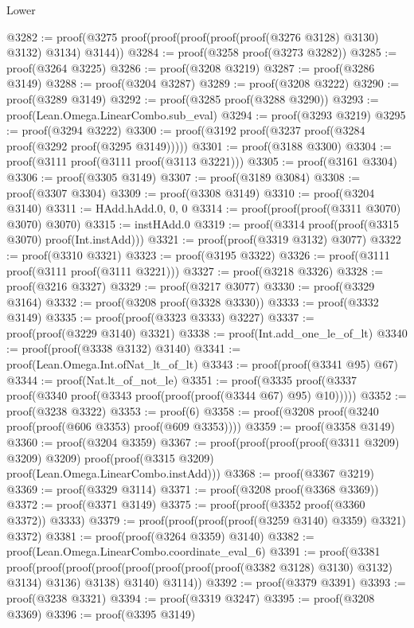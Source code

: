 \begin{lexlean}{Lower}
\begin{coremodule}
@3282 := proof(@3275 proof(proof(proof(proof(proof(@3276 @3128) @3130) @3132) @3134) @3144))
@3284 := proof(@3258 proof(@3273 @3282))
@3285 := proof(@3264 @3225)
@3286 := proof(@3208 @3219)
@3287 := proof(@3286 @3149)
@3288 := proof(@3204 @3287)
@3289 := proof(@3208 @3222)
@3290 := proof(@3289 @3149)
@3292 := proof(@3285 proof(@3288 @3290))
@3293 := proof(Lean.Omega.LinearCombo.sub_eval)
@3294 := proof(@3293 @3219)
@3295 := proof(@3294 @3222)
@3300 := proof(@3192 proof(@3237 proof(@3284 proof(@3292 proof(@3295 @3149)))))
@3301 := proof(@3188 @3300)
@3304 := proof(@3111 proof(@3111 proof(@3113 @3221)))
@3305 := proof(@3161 @3304)
@3306 := proof(@3305 @3149)
@3307 := proof(@3189 @3084)
@3308 := proof(@3307 @3304)
@3309 := proof(@3308 @3149)
@3310 := proof(@3204 @3140)
@3311 := HAdd.hAdd.{0, 0, 0}
@3314 := proof(proof(proof(@3311 @3070) @3070) @3070)
@3315 := instHAdd.{0}
@3319 := proof(@3314 proof(proof(@3315 @3070) proof(Int.instAdd)))
@3321 := proof(proof(@3319 @3132) @3077)
@3322 := proof(@3310 @3321)
@3323 := proof(@3195 @3322)
@3326 := proof(@3111 proof(@3111 proof(@3111 @3221)))
@3327 := proof(@3218 @3326)
@3328 := proof(@3216 @3327)
@3329 := proof(@3217 @3077)
@3330 := proof(@3329 @3164)
@3332 := proof(@3208 proof(@3328 @3330))
@3333 := proof(@3332 @3149)
@3335 := proof(proof(@3323 @3333) @3227)
@3337 := proof(proof(@3229 @3140) @3321)
@3338 := proof(Int.add_one_le_of_lt)
@3340 := proof(proof(@3338 @3132) @3140)
@3341 := proof(Lean.Omega.Int.ofNat_lt_of_lt)
@3343 := proof(proof(@3341 @95) @67)
@3344 := proof(Nat.lt_of_not_le)
@3351 := proof(@3335 proof(@3337 proof(@3340 proof(@3343 proof(proof(proof(@3344 @67) @95) @10)))))
@3352 := proof(@3238 @3322)
@3353 := proof(6)
@3358 := proof(@3208 proof(@3240 proof(proof(@606 @3353) proof(@609 @3353))))
@3359 := proof(@3358 @3149)
@3360 := proof(@3204 @3359)
@3367 := proof(proof(proof(proof(@3311 @3209) @3209) @3209)
      proof(proof(@3315 @3209) proof(Lean.Omega.LinearCombo.instAdd)))
@3368 := proof(@3367 @3219)
@3369 := proof(@3329 @3114)
@3371 := proof(@3208 proof(@3368 @3369))
@3372 := proof(@3371 @3149)
@3375 := proof(proof(@3352 proof(@3360 @3372)) @3333)
@3379 := proof(proof(proof(proof(@3259 @3140) @3359) @3321) @3372)
@3381 := proof(proof(@3264 @3359) @3140)
@3382 := proof(Lean.Omega.LinearCombo.coordinate_eval_6)
@3391 := proof(@3381
      proof(proof(proof(proof(proof(proof(proof(proof(@3382 @3128) @3130) @3132) @3134) @3136)
              @3138)
            @3140)
          @3114))
@3392 := proof(@3379 @3391)
@3393 := proof(@3238 @3321)
@3394 := proof(@3319 @3247)
@3395 := proof(@3208 @3369)
@3396 := proof(@3395 @3149)

\end{coremodule}
\end{lexlean}
